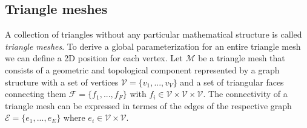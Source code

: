 
\subsection{Triangle meshes}
A collection of triangles without any particular mathematical structure is called \textit{triangle meshes}. To derive a global parameterization for an entire triangle mesh we can define a 2D position for each vertex. Let $\mathcal{M}$ be a triangle mesh that consists of a geometric and topological component represented by a graph structure with a set of vertices $\mathcal{V} = \{ v_1, ..., v_V \}$ and a set of triangular faces connecting them $\mathcal{F} = \{ f_1, ... , f_F \}$ with $f_i \in \mathcal{V} \times \mathcal{V} \times \mathcal{V}$. The connectivity of a triangle mesh can be expressed in termes of the edges of the respective graph $\mathcal{E} = \{ e_1, ..., e_E \}$ where $e_i \in \mathcal{V} \times \mathcal{V}$.
\cite{polygonmeshprocessing}
